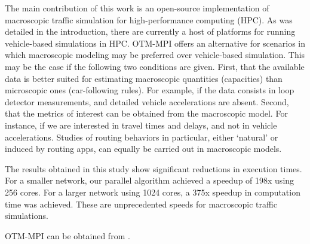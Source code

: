 The main contribution of this work is an open-source implementation of macroscopic traffic simulation for high-performance computing (HPC). As was detailed in the introduction, there are currently a host of platforms for running vehicle-based simulations in HPC. OTM-MPI offers an alternative for scenarios in which macroscopic modeling may be preferred over vehicle-based simulation. This may be the case if the following two conditions are given. First, that the available data is better suited for estimating macroscopic quantities (capacities) than microscopic ones (car-following rules). For example, if the data consists in loop detector measurements, and detailed vehicle accelerations are absent. Second, that the metrics of interest can be obtained from the macroscopic model. For instance, if we are interested in travel times and delays, and not in vehicle accelerations. Studies of routing behaviors in particular, either `natural' or induced by routing apps, can equally be carried out in macroscopic models. 

The results obtained in this study show significant reductions in execution times. 
For a smaller network, our parallel algorithm achieved a speedup of 198x using 256 cores. For a larger network using 1024 cores, a 375x speedup in computation time was achieved. These are unprecedented speeds for macroscopic traffic simulations. 

OTM-MPI can be obtained from \cite{otmmpi}.